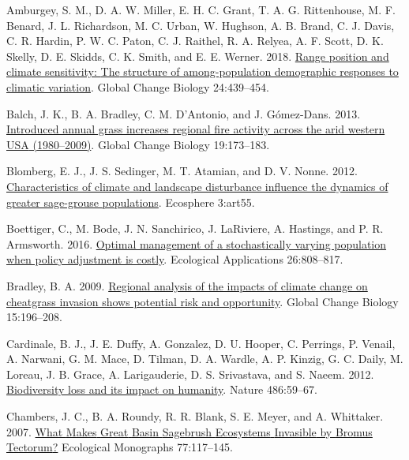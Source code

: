 \documentclass[
  12pt,
]{article}
\newlength{\cslhangindent}
\newlength{\cslentryspacingunit} %
\newenvironment{CSLReferences}[2] %
 {%
  \setlength{\parindent}{0pt}
  \ifodd #1
  \let\oldpar\par
  \def\par{\hangindent=\cslhangindent\oldpar}
  \fi
  \setlength{\parskip}{#2\cslentryspacingunit}
 }%
 {}
\begin{document}
\hypertarget{refs}{}
\begin{CSLReferences}{1}{0}
\leavevmode{}%
Amburgey, S. M., D. A. W. Miller, E. H. C. Grant, T. A. G. Rittenhouse, M. F. Benard, J. L. Richardson, M. C. Urban, W. Hughson, A. B. Brand, C. J. Davis, C. R. Hardin, P. W. C. Paton, C. J. Raithel, R. A. Relyea, A. F. Scott, D. K. Skelly, D. E. Skidds, C. K. Smith, and E. E. Werner. 2018. \href{https://doi.org/10.1111/gcb.13817}{Range position and climate sensitivity: {The} structure of among-population demographic responses to climatic variation}. Global Change Biology 24:439--454.

\leavevmode{}%
Balch, J. K., B. A. Bradley, C. M. D'Antonio, and J. Gómez-Dans. 2013. \href{https://doi.org/10.1111/gcb.12046}{Introduced annual grass increases regional fire activity across the arid western {USA} (1980--2009)}. Global Change Biology 19:173--183.

\leavevmode{}%
Blomberg, E. J., J. S. Sedinger, M. T. Atamian, and D. V. Nonne. 2012. \href{https://doi.org/10.1890/ES11-00304.1}{Characteristics of climate and landscape disturbance influence the dynamics of greater sage-grouse populations}. Ecosphere 3:art55.

\leavevmode{}%
Boettiger, C., M. Bode, J. N. Sanchirico, J. LaRiviere, A. Hastings, and P. R. Armsworth. 2016. \href{https://doi.org/10.1890/15-0236}{Optimal management of a stochastically varying population when policy adjustment is costly}. Ecological Applications 26:808--817.

\leavevmode{}%
Bradley, B. A. 2009. \href{https://doi.org/10.1111/j.1365-2486.2008.01709.x}{Regional analysis of the impacts of climate change on cheatgrass invasion shows potential risk and opportunity}. Global Change Biology 15:196--208.

\leavevmode{}%
Cardinale, B. J., J. E. Duffy, A. Gonzalez, D. U. Hooper, C. Perrings, P. Venail, A. Narwani, G. M. Mace, D. Tilman, D. A. Wardle, A. P. Kinzig, G. C. Daily, M. Loreau, J. B. Grace, A. Larigauderie, D. S. Srivastava, and S. Naeem. 2012. \href{https://doi.org/10.1038/nature11148}{Biodiversity loss and its impact on humanity}. Nature 486:59--67.

\leavevmode{}%
Chambers, J. C., B. A. Roundy, R. R. Blank, S. E. Meyer, and A. Whittaker. 2007. \href{https://doi.org/10.1890/05-1991}{What {Makes} {Great} {Basin} {Sagebrush} {Ecosystems} {Invasible} by {Bromus} {Tectorum}?} Ecological Monographs 77:117--145.


\end{CSLReferences}
\end{document}
